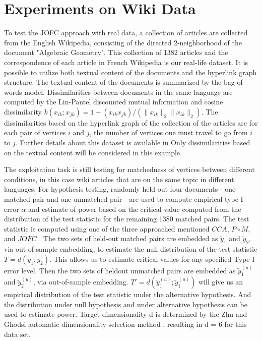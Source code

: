 \documentclass[12pt,oneside,final]{thesis}\usepackage[]{graphicx}\usepackage[]{color}
\begin{document}
\section{Experiments on Wiki Data}
To test the JOFC approach with real data, a collection of articles are collected from the English Wikipedia, consisting of the
 directed 2-neighborhood of the document "Algebraic Geometry". 
   This  collection of 1382 articles and the correspondence of each article in French 
Wikipedia is our real-life dataset. It is possible to utilize both textual content of the documents and the hyperlink graph structure. The textual content of the documents is summarized by the bag-of-words model. Dissimilarities between documents  in the same language are computed by the Lin-Pantel discounted mutual information \cite{LinPantel,PantelLin}
 and cosine dissimilarity $k(x_{ik}; x_{jk}) = 1 - (x_{ik} x_{jk})/(\|x_{ik}\|_2\|x_{ik}\|_2)$. 
 The dissimilarities based on the hyperlink graph of the collection of the articles are 
 for each pair of vertices $i$ and $j$, the number of vertices one must travel to go from $i$ to $j$.  Further details about this dataset is available in \cite{Zhiliang_disparate}     
Only  dissimilarities based on the textual content will be considered in this example.
   
The exploitation task is still testing for matchedness of vertices between different conditions, in this case wiki articles that are on the same topic  in  different languages.
For hypothesis testing,   randomly held out four documents - one matched pair and one unmatched pair
 -  are used to compute empirical type I error $\alpha$ and estimate of power based on the critical value computed
  from the distribution of the test statistic for the remaining 1380 matched pairs. 
The test statistic is computed using one of the three approached mentioned  $CCA$, $P\circ M$, and $JOFC$ . 
The two sets of held-out matched pairs are embedded as $\tilde{y}_1$ and $\tilde{y}_2$, via out-of-sample
embedding, to estimate the null distribution of the test statistic $T = d(\tilde{y}_1; \tilde{y}_2)$. This allows
us to estimate critical values for any specified Type I error level. 
Then the two sets of heldout unmatched pairs are embedded as $\tilde{y}_1^{(u)}$ and $\tilde{y}_2^{(u)}$, via out-of-sample embedding. 
$T' = d(\tilde{y}_1^{(u)}; \tilde{y}_1^{(u)})$ will give us an empirical distribution of the test statistic  under the alternative hypothesis. 
And the distribution under null hypothesis and under alternative hypothesis can be used to estimate power.
Target dimensionality d is determined by the Zhu and Ghodsi  automatic dimensionality selection
method \cite{ZhuGhodsi}, resulting in d = 6 for this data set.
\end{document}
